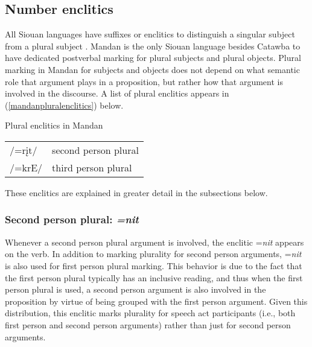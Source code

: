 \subsection{Number enclitics}

All Siouan languages have suffixes or enclitics to distinguish a singular subject from a plural subject \citep[106]{parksrankin2001}. Mandan is the only Siouan language besides Catawba to have dedicated postverbal marking for plural subjects and plural objects. Plural marking in Mandan for subjects and objects does not depend on what semantic role that argument plays in a proposition, but rather how that argument is involved in the discourse. A list of plural enclitics appears in (\ref{mandanpluralenclitics}) below.

\begin{exe}

\item\label{mandanpluralenclitics} Plural enclitics in Mandan

\begin{tabular}{ll}

	/=rįt/ & second person plural\\
	/=krE/ & third person plural\\ 

\end{tabular}

\end{exe}

These enclitics are explained in greater detail in the subsections below.

\subsubsection{Second person plural: \textit{=nit}}\label{subsecnit}

Whenever a second person plural argument is involved, the enclitic =\textit{nit} appears on the verb. In addition to marking plurality for second person arguments, =\textit{nit} is also used for first person plural marking. This behavior is due to the fact that the first person plural typically has an inclusive reading, and thus when the first person plural is used, a second person argument is also involved in the proposition by virtue of being grouped with the first person argument. Given this distribution, this enclitic marks plurality for speech act participants (i.e., both first person and second person arguments) rather than just for second person arguments. 

